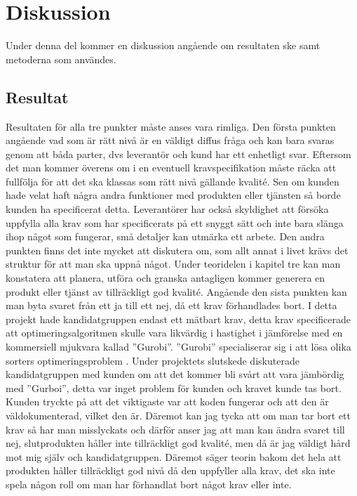 \section{Diskussion}
Under denna del kommer en diskussion angående om resultaten ske samt metoderna som användes.
\subsection{Resultat}
Resultaten för alla tre punkter måste anses vara rimliga. Den första punkten angående vad som är rätt nivå är en väldigt diffus fråga och kan bara svaras genom att båda parter, dvs leverantör och kund har ett enhetligt svar. Eftersom det man kommer överens om i en eventuell kravspecifikation måste räcka att fullfölja för att det ska klassas som rätt nivå gällande kvalité. Sen om kunden hade velat haft några andra funktioner med produkten eller tjänsten så borde kunden ha specificerat detta. Leverantörer har också skyldighet att försöka uppfylla alla krav som har specificerats på ett snyggt sätt och inte bara slänga ihop något som fungerar, små detaljer kan utmärka ett arbete.
\newline
\newline
Den andra punkten finns det inte mycket att diskutera om, som allt annat i livet krävs det struktur för att man ska uppnå något. Under teoridelen i kapitel tre kan man konstatera att planera, utföra och granska antagligen kommer generera en produkt eller tjänst av tillräckligt god kvalité.
\newline
\newline
Angående den sista punkten kan man byta svaret från ett ja till ett nej, då ett krav förhandlades bort. I detta projekt hade kandidatgruppen endast ett mätbart krav, detta krav specificerade att optimeringsalgoritmen skulle vara likvärdig i hastighet i jämförelse med en kommersiell mjukvara kallad ''Gurobi''. ''Gurobi'' specialiserar sig i att lösa olika sorters optimeringsproblem \citep{gurobi}. Under projektets slutskede diskuterade kandidatgruppen med kunden om att det kommer bli svårt att vara jämbördig med ''Gurboi'', detta var inget problem för kunden och kravet kunde tas bort. Kunden tryckte på att det viktigaste var att koden fungerar och att den är väldokumenterad, vilket den är. Däremot kan jag tycka att om man tar bort ett krav så har man misslyckats och därför anser jag att man kan ändra svaret till nej, slutprodukten håller inte tillräckligt god kvalité, men då är jag väldigt hård mot mig själv och kandidatgruppen. Däremot säger teorin bakom det hela att produkten håller tillräckligt god nivå då den uppfyller alla krav, det ska inte spela någon roll om man har förhandlat bort något krav eller inte.

